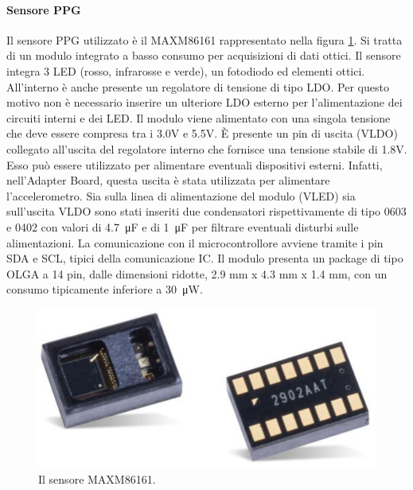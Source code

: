\paragraph{Sensore PPG} Il sensore PPG utilizzato è il MAXM86161 rappresentato nella figura \ref{fig:ImmagineMAXM86161}.
Si tratta di un modulo integrato a basso consumo per acquisizioni di dati ottici. Il sensore integra 3 LED (rosso, infrarosse e verde), un fotodiodo ed elementi ottici. All'interno è anche presente un regolatore di tensione di tipo LDO. Per questo motivo non è necessario inserire un ulteriore LDO esterno per l'alimentazione dei circuiti interni e dei LED. Il modulo viene alimentato con una singola tensione che deve essere compresa tra i 3.0V e 5.5V. \`E presente un pin di uscita (VLDO) collegato all'uscita del regolatore interno che fornisce una tensione stabile di 1.8V. Esso può essere utilizzato per alimentare eventuali dispositivi esterni. Infatti, nell'Adapter Board, questa uscita è stata utilizzata per alimentare l'accelerometro. Sia sulla linea di alimentazione del modulo (VLED) sia sull'uscita VLDO sono stati inseriti due condensatori rispettivamente di tipo 0603 e 0402 con valori di \SI{4.7}{\micro\farad} e di \SI{1}{\micro\farad} per filtrare eventuali disturbi sulle alimentazioni. La comunicazione con il microcontrollore avviene tramite i pin SDA e SCL, tipici della comunicazione IC. Il modulo presenta un package di tipo OLGA a 14 pin, dalle dimensioni ridotte, 2.9 mm x 4.3 mm x 1.4 mm, con un consumo tipicamente inferiore a \SI{30}{\micro\watt}.
\begin{figure}[h]
	\centering
	\includegraphics[width=0.6\linewidth]{ImageFiles/Hardware/ImmagineMAXM86161}
	\caption{Il sensore MAXM86161.}
	\label{fig:ImmagineMAXM86161}
\end{figure}

